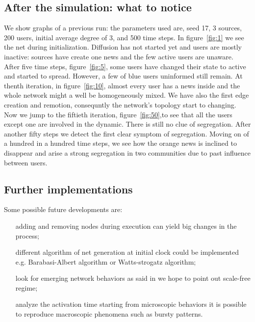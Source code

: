 \subsection{After the simulation: what to notice}\label{subsec:after}
We show graphs of a previous run: the parameters used are, seed 17, 3 sources,
200 users, initial average degree of 3, and 500 time steps.
In figure~\ref{fig:1} we see the net during initialization. Diffusion
has not started yet and users are mostly inactive:
sources have create one news and the few active users are unaware.
After five time steps, figure~\ref{fig:5}, some users have changed their state
to active and started to spread. However, a few of blue users uninformed still remain.
At thenth iteration, in figure~\ref{fig:10}, almost every user
has a news inside and the whole network might a well be homogeneously mixed. 
We have also the first edge creation and remotion, 
consequntly the network's topology start to changing.
Now we jump to the fiftieth iteration, figure~\ref{fig:50},to see that
all the users except one are involved in the dynamic. There is still no
clue of segregation.
After another fifty steps we detect the first clear symptom of segregation.
Moving on of a hundred in a hundred time steps, we see how the orange news
is inclined to disappear and arise a strong segregation in two communities
 due to past influence between users.

\subsection{Further implementations}\label{subsec:implementations}
Some possible future developments are:
\begin{itemize}
\item [adding and removing nodes during execution] can yield big changes
  in the process;
  \item [different algorithm of net generation] at initial clock could be implemented e.g. Barabasi-Albert algorithm or Watts-strogatz algorithm;
\item [look for emerging network behaviors] as said in \textit{} we hope to point out scale-free regime;
\item [analyze the activation time] starting from microscopic behaviors
  it is possible to reproduce macroscopic phenomena such as bursty
  patterns\cite{goh_burstiness_2008}.
\end{itemize}

